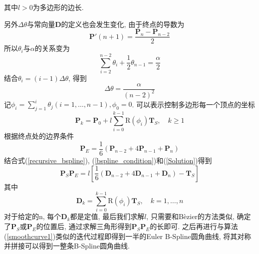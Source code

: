 \documentclass[utf8]{ctexart} %
\begin{document}
	 其中$l>0$为多边形的边长.\par 
	 另外$\Delta\theta$与常向量$\boldsymbol{D}$的定义也会发生变化, 由于终点的导数为
	 \begin{equation}
	 \boldsymbol{P}'(n+1) = \frac{\boldsymbol{P}_n-\boldsymbol{P}_{n-2}}2
	 \end{equation}
	 所以$\theta_i$与$\alpha$的关系变为
	 \begin{equation}
	 \sum_{i=2}^{n-2}\theta_i+\frac12\theta_{n-1}=\frac{\alpha}2
	 \end{equation}
	 结合$\theta_i=(i-1)\Delta\theta$, 得到
	 \begin{equation}
	 \Delta\theta = \frac{\alpha}{(n-2)^2}
	 \end{equation}
	 记$\phi_i=\sum_{j=1}^i\theta_j (i = 1,\dots,n-1), \phi_0 = 0$. 可以表示控制多边形每一个顶点的坐标
	 \begin{equation}\label{recursive_bspline}
	 \boldsymbol{P}_k = \boldsymbol{P}_0+l\sum_{i=0}^{k-1}\text{R}(\phi_i)\boldsymbol{T}_S,\quad k\geq1
	 \end{equation}
	 根据终点处的边界条件
	 \begin{equation}\label{bspline_condition}
	 \boldsymbol{P}_E = \frac{1}6(\boldsymbol{P}_{n-2}+4\boldsymbol{P}_{n-1}+\boldsymbol{P}_n)
	 \end{equation}
	结合式(\ref{recursive_bspline}), (\ref{bspline_condition})和(\ref{Solution})得到
	\begin{equation}
	\boldsymbol{P}_S\boldsymbol{P}_E=l[\frac16(\boldsymbol{D}_{n-2}+4\boldsymbol{D}_{n-1}+\boldsymbol{D}_n)-\boldsymbol{T}_S]
	\end{equation}
	其中\begin{equation}
	\boldsymbol{D}_k = \sum_{i=0}^{k-1}\text{R}(\phi_i)\boldsymbol{T}_S,\quad k=1,\dots,n
	\end{equation}
	对于给定的n, 每个$\boldsymbol{D}_k$都是定值, 最后我们求解$l$, 只需要和B\`ezier的方法类似, 确定了$\boldsymbol{P}_S$或$\boldsymbol{P}_E$的位置后, 通过求解三角形得到$\boldsymbol{P}_S\boldsymbol{P}_E$的长即可. 之后再进行与算法(\ref{smoothcurve1})类似的迭代过程即得到一半的Euler B-Spline圆角曲线, 将其对称并拼接可以得到一整条B-Spline圆角曲线.
\end{document}
